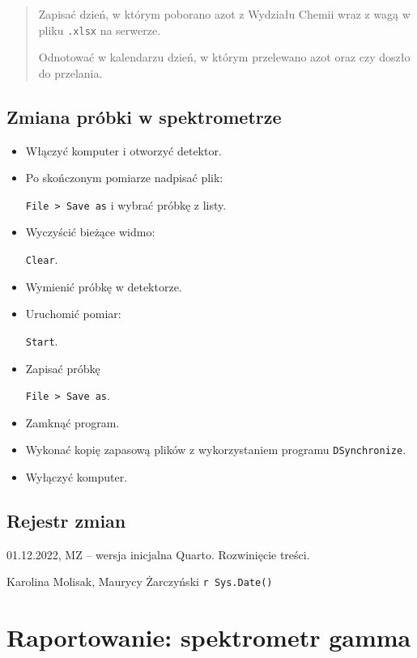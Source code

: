 \documentclass[
  letterpaper,
  DIV=11,
  numbers=noendperiod]{scrreprt}
\begin{document}
\begin{quote}
Zapisać dzień, w którym poborano azot z Wydziału Chemii wraz z wagą w
pliku \texttt{.xlsx} na serwerze.

Odnotować w kalendarzu dzień, w którym przelewano azot oraz czy doszło
do przelania.
\end{quote}

\hypertarget{zmiana-pruxf3bki-w-spektrometrze}{%
\section{Zmiana próbki w
spektrometrze}\label{zmiana-pruxf3bki-w-spektrometrze}}

\begin{itemize}
\item
  Włączyć komputer i otworzyć detektor.
\item
  Po skończonym pomiarze nadpisać plik:

  \texttt{File\ \textgreater{}\ Save\ as} i wybrać próbkę z listy.
\item
  Wyczyścić bieżące widmo:

  \texttt{Clear}.
\item
  Wymienić próbkę w detektorze.
\item
  Uruchomić pomiar:

  \texttt{Start}.
\item
  Zapisać próbkę

  \texttt{File\ \textgreater{}\ Save\ as}.
\item
  Zamknąć program.
\item
  Wykonać kopię zapasową plików z wykorzystaniem programu
  \texttt{DSynchronize}.
\item
  Wyłączyć komputer.
\end{itemize}

\hypertarget{rejestr-zmian-7}{%
\section{Rejestr zmian}\label{rejestr-zmian-7}}

01.12.2022, MZ -- wersja inicjalna Quarto. Rozwinięcie treści.

Karolina Molisak, Maurycy Żarczyński \texttt{r\ Sys.Date()}

\hypertarget{raportowanie-spektrometr-gamma}{%
\chapter{Raportowanie: spektrometr
gamma}\label{raportowanie-spektrometr-gamma}}
\end{document}
